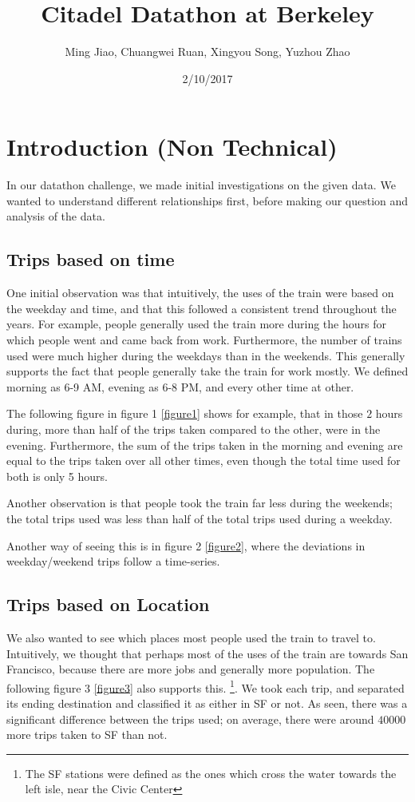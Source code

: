 \documentclass[12pt,twoside]{article}
\title{Citadel Datathon at Berkeley}
\date{2/10/2017}
\author{Ming Jiao, Chuangwei Ruan, Xingyou Song, Yuzhou Zhao}
\begin{document}
\nocite{*}

\maketitle
{}

\tableofcontents
\section{Introduction (Non Technical)}
In our datathon challenge, we made initial investigations on the given data. We wanted to understand different relationships first, before making our question and analysis of the data. 
\subsection{Trips based on time} One initial observation was that intuitively, the uses of the train were based on the weekday and time, and that this followed a consistent trend throughout the years. For example, people generally used the train more during the hours for which people went and came back from work. Furthermore, the number of trains used were much higher during the weekdays than in the weekends. This generally supports the fact that people generally take the train for work mostly. We defined morning as 6-9 AM, evening as 6-8 PM, and every other time at other.
 
The following figure in figure 1 \ref{figure1} shows for example, that in those $2$ hours during, more than half of the trips taken compared to the other, were in the evening. Furthermore, the sum of the trips taken in the morning and evening are equal to the trips taken over all other times, even though the total time used for both is only 5 hours. 

Another observation is that people took the train far less during the weekends; the total trips used was less than half of the total trips used during a weekday. 


Another way of seeing this is in figure 2 \ref{figure2}, where the deviations in weekday/weekend trips follow a time-series.  

\subsection{Trips based on Location}
We also wanted to see which places most people used the train to travel to. Intuitively, we thought that perhaps most of the uses of the train are towards San Francisco, because there are more jobs and generally more population. The following figure 3 \ref{figure3} also supports this. \footnote{The SF stations were defined as the ones which cross the water towards the left isle, near the Civic Center}. We took each trip, and separated its ending destination and classified it as either in SF or not. As seen, there was a significant difference between the trips used; on average, there were around $40000$ more trips taken to SF than not. 
\end{document}
